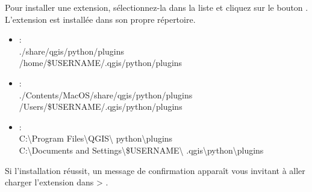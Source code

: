 
Pour installer une extension, sélectionnez-la dans la liste et cliquez sur le bouton . L'extension est installée dans son propre répertoire.

\begin{itemize}
\item {} :\\
./share/qgis/python/plugins \\
/home/\$USERNAME/.qgis/python/plugins
\item {} :\\
./Contents/MacOS/share/qgis/python/plugins \\
/Users/\$USERNAME/.qgis/python/plugins
\item {} :\\
C:\textbackslash Program Files\textbackslash QGIS\textbackslash
python\textbackslash plugins \\
C:\textbackslash Documents and Settings\textbackslash\$USERNAME\textbackslash
.qgis\textbackslash python\textbackslash plugins
\end{itemize}

Si l'installation réussit, un message de confirmation apparaît vous invitant à aller charger l'extension dans  > .

